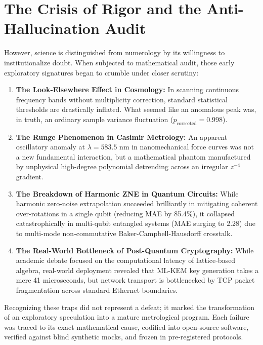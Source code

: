 \section*{The Crisis of Rigor and the Anti-Hallucination Audit}
However, science is distinguished from numerology by its willingness to institutionalize doubt. When subjected to mathematical audit, those early exploratory signatures began to crumble under closer scrutiny:
\begin{enumerate}
    \item \textbf{The Look-Elsewhere Effect in Cosmology:} In scanning continuous frequency bands without multiplicity correction, standard statistical thresholds are drastically inflated. What seemed like an anomalous peak was, in truth, an ordinary sample variance fluctuation ($p_{\text{corrected}} = 0.998$).
    \item \textbf{The Runge Phenomenon in Casimir Metrology:} An apparent oscillatory anomaly at $\lambda = 583.5\text{ nm}$ in nanomechanical force curves was not a new fundamental interaction, but a mathematical phantom manufactured by unphysical high-degree polynomial detrending across an irregular $z^{-4}$ gradient.
    \item \textbf{The Breakdown of Harmonic ZNE in Quantum Circuits:} While harmonic zero-noise extrapolation succeeded brilliantly in mitigating coherent over-rotations in a single qubit (reducing MAE by 85.4\%), it collapsed catastrophically in multi-qubit entangled systems (MAE surging to 2.28) due to multi-mode non-commutative Baker-Campbell-Hausdorff crosstalk.
    \item \textbf{The Real-World Bottleneck of Post-Quantum Cryptography:} While academic debate focused on the computational latency of lattice-based algebra, real-world deployment revealed that ML-KEM key generation takes a mere 41 microseconds, but network transport is bottlenecked by TCP packet fragmentation across standard Ethernet boundaries.
\end{enumerate}

Recognizing these traps did not represent a defeat; it marked the transformation of an exploratory speculation into a mature metrological program. Each failure was traced to its exact mathematical cause, codified into open-source software, verified against blind synthetic mocks, and frozen in pre-registered protocols.

